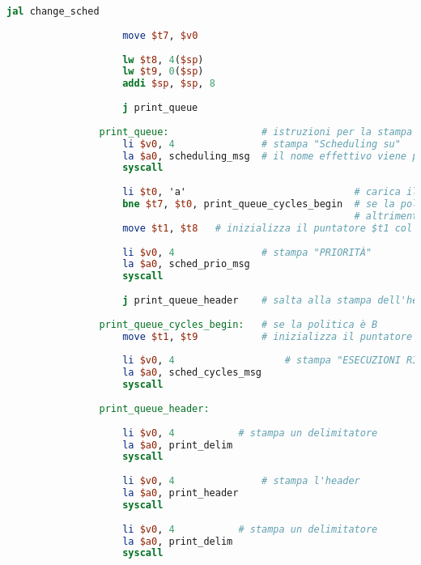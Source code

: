 \begin{center}
\begin{lstlisting}[language=mips, gobble=14, stepnumber=1]
                    jal change_sched
                    
                    move $t7, $v0
                    
                    lw $t8, 4($sp)
                    lw $t9, 0($sp)
                    addi $sp, $sp, 8
                    
                    j print_queue
                    
                print_queue:                # istruzioni per la stampa della coda
                    li $v0, 4               # stampa "Scheduling su"
                    la $a0, scheduling_msg  # il nome effettivo viene poi stampato a seconda dello scheduling attuale
                    syscall
                
                    li $t0, 'a'                             # carica il carattere 'a', per poterlo comparare con la politica attuale
                    bne $t7, $t0, print_queue_cycles_begin  # se la politica non è A, esegui l'inizializzazione per la politica B
                                                            # altrimenti
                    move $t1, $t8   # inizializza il puntatore $t1 col puntatore di A
                    
                    li $v0, 4               # stampa "PRIORITÀ"
                    la $a0, sched_prio_msg
                    syscall
                    
                    j print_queue_header    # salta alla stampa dell'header della tabella
                    
                print_queue_cycles_begin:   # se la politica è B
                    move $t1, $t9           # inizializza il puntatore $t1 col puntatore di B
                
                    li $v0, 4                   # stampa "ESECUZIONI RIMANENTI"
                    la $a0, sched_cycles_msg
                    syscall
                    
                print_queue_header:
                    
                    li $v0, 4           # stampa un delimitatore
                    la $a0, print_delim
                    syscall
                    
                    li $v0, 4               # stampa l'header
                    la $a0, print_header
                    syscall
                    
                    li $v0, 4           # stampa un delimitatore
                    la $a0, print_delim
                    syscall
                    

\end{lstlisting}
\end{center}
